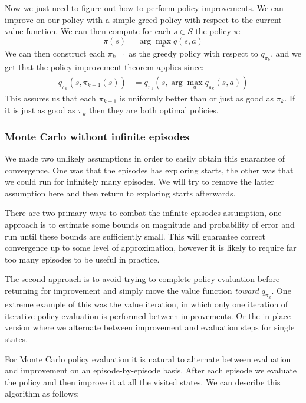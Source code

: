     Now we just need to figure out how to perform policy-improvements. We can 
    improve on our policy with a simple greed policy with respect to the 
    current value function. We can then compute for each $s \in S$ the policy 
    $\pi$:
    \begin{equation*}
        \pi(s) = \arg\max_a q(s,a)
    \end{equation*}
    We can then construct each $\pi_{k+1}$ as the greedy policy with respect to 
    $q_{\pi_k}$, and we get that the policy improvement theorem applies since:
    \begin{align*}
        q_{\pi_k}(s,\pi_{k+1}(s)) &= q_{\pi_k}(s, \arg\max_a q_{\pi_k}(s,a))
    \end{align*}
    This assures us that each $\pi_{k+1}$ is uniformly better than or just as 
    good as $\pi_k$. If it is just as good as $\pi_k$ then they are both 
    optimal policies.
    
    \subsubsection{Monte Carlo without infinite episodes}
    We made two unlikely assumptions in order to easily obtain this guarantee 
    of convergence. One was that the episodes has exploring starts, the other 
    was that we could run for infinitely many episodes. We will try to remove 
    the latter assumption here and then return to exploring starts afterwards.
   
    There are two primary ways to combat the infinite episodes assumption, one 
    approach is to estimate some bounds on magnitude and probability of error 
    and run until these bounds are sufficiently small. This will guarantee 
    correct convergence up to some level of approximation, however it is likely 
    to require far too many episodes to be useful in practice.
    
    The second approach is to avoid trying to complete policy evaluation before 
    returning for improvement and simply move the value function \textit{toward}
    $q_{\pi_k}$. One extreme example of this was the value iteration, in which 
    only one iteration of iterative policy evaluation is performed between 
    improvements. Or the in-place version where we alternate between 
    improvement and evaluation steps for single states.
    
    For Monte Carlo policy evaluation it is natural to alternate between 
    evaluation and improvement on an episode-by-episode basis. After each 
    episode we evaluate the policy and then improve it at all the visited 
    states. We can describe this algorithm as follows:
    
